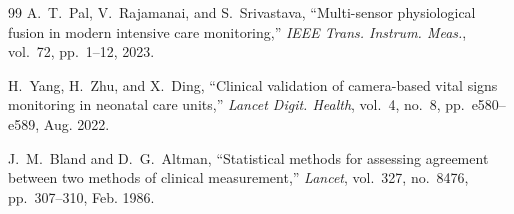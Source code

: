 \documentclass[journal]{IEEEtran}
\begin{document}
\begin{thebibliography}{99}
A.~T.~Pal, V.~Rajamanai, and S.~Srivastava,
``Multi-sensor physiological fusion in modern intensive care monitoring,''
\emph{IEEE Trans. Instrum. Meas.}, vol.~72, pp.~1--12, 2023.

H.~Yang, H.~Zhu, and X.~Ding,
``Clinical validation of camera-based vital signs monitoring in neonatal care units,''
\emph{Lancet Digit. Health}, vol.~4, no.~8, pp.~e580--e589, Aug. 2022.

J.~M.~Bland and D.~G.~Altman,
``Statistical methods for assessing agreement between two methods of clinical measurement,''
\emph{Lancet}, vol.~327, no.~8476, pp.~307--310, Feb. 1986.

\end{thebibliography}
\end{document}
